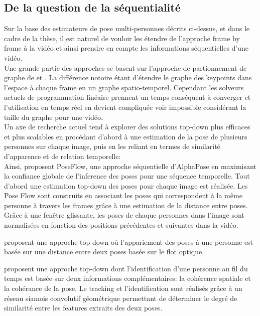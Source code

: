 \subsection{De la question de la séquentialité}
Sur la base des estimateurs de pose multi-personnes décrits ci-dessus, et dans le cadre de la thèse, il est naturel de vouloir les étendre de l'approche frame by frame à la vidéo et ainsi prendre en compte les informations séquentielles d'une vidéo.\\

Une grande partie des approches se basent sur l'approche de partionnement de graphe de \cite{2015arXiv151106645P} et \cite{2016arXiv160503170I}. La différence notoire étant d'étendre le graphe des keypoints dans l'espace à chaque frame en un graphe spatio-temporel. Cependant les solveurs actuels de programmation linéaire prennent un temps conséquent à converger et l'utilisation en temps réel en devient compliquée voir impossible considérant la taille du graphe pour une vidéo.\\

Un axe de recherche actuel tend à explorer des solutions top-down plus efficaces et plus scalables en procédant d'abord à une estimation de la pose de plusieurs personnes sur chaque image, puis en les reliant
en termes de similarité d'apparence et de relation temporelle:\\

Ainsi, \cite{2018arXiv180200977X} proposent PoseFlow, une approche séquentielle d'AlphaPose \cite{fang2017rmpe} en maximisant la confiance globale de l'inference des poses pour une séquence temporelle. Tout d'abord une estimation top-down des poses pour chaque image est réalisée. Les Pose Flow sont construits en associant les poses qui correspondent à la même personne à travers les frames grâce à une estimation de la distance entre poses. Grâce à une fenêtre glissante, les poses de chaque personnes dans l'image sont normalisées en fonction des positions précédentes et suivantes dans la vidéo.

\cite{2019arXiv190502822N} proposent une approche top-down où l'appariement des poses à une personne est basée sur une distance entre deux poses basée sur le flot optique.

\cite{2018arXiv180406208X} proposent une approche top-down dont l'identification d'une personne au fil du temps est basée sur deux informations complémentaires: la cohérence spatiale et la cohérance de la pose. Le tracking et l'identification sont réalisés grâce à un réseau siamois convolutif géométrique permettant de déterminer le degré de similarité entre les features extraits des deux poses.
 
